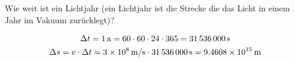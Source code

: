 

\begin{aufgabe}
Wie weit ist ein Lichtjahr (ein Lichtjahr ist die Strecke die das Licht in einem Jahr im Vakuum zurücklegt)?
\begin{loesung}
	\begin{gather*}
\Delta t = \SI{1}{a} = 60 \cdot 60 \cdot 24 \cdot 365 = \SI{31536000}{s}\\
\Delta s = v \cdot \Delta t = \SI{3E8}{m/s} \cdot \SI{31536000}{s}=\SI{9.4608e+15}{m}
	\end{gather*}
\end{loesung}
\end{aufgabe}
